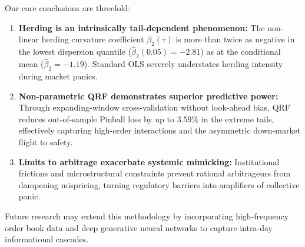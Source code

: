 \documentclass[12pt, a4paper]{article}
\begin{document}
Our core conclusions are threefold:
\begin{enumerate}[label=\arabic*.]
  \item \textbf{Herding is an intrinsically tail-dependent phenomenon:} The non-linear herding curvature coefficient $\beta_2(\tau)$ is more than twice as negative in the lowest dispersion quantile ($\hat\beta_2(0.05) = -2.81$) as at the conditional mean ($\hat\beta_2=-1.19$). Standard OLS severely understates herding intensity during market panics.
  \item \textbf{Non-parametric QRF demonstrates superior predictive power:} Through expanding-window cross-validation without look-ahead bias, QRF reduces out-of-sample Pinball loss by up to $3.59\%$ in the extreme tails, effectively capturing high-order interactions and the asymmetric down-market flight to safety.
  \item \textbf{Limits to arbitrage exacerbate systemic mimicking:} Institutional frictions and microstructural constraints prevent rational arbitrageurs from dampening mispricing, turning regulatory barriers into amplifiers of collective panic.
\end{enumerate}

Future research may extend this methodology by incorporating high-frequency order book data and deep generative neural networks to capture intra-day informational cascades.

\newpage

\end{document}
